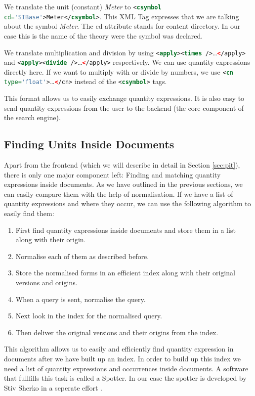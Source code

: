 We translate the unit (constant) \textit{Meter} to \lstinline[language=XML]{<csymbol cd='SIBase'>Meter</csymbol>}. This XML Tag expresses that we are talking about the symbol \textit{Meter}. The cd attribute stands for content directory. In our case this is the name of the theory were the symbol was declared.

We translate multiplication and division by using \lstinline[language=XML]{<apply><times />}\dots\lstinline[language=XML]{</apply>} and \lstinline[language=XML]{<apply><divide />}\dots\lstinline[language=XML]{</apply>} respectively. We can use quantity expressions directly here. If we want to multiply with or divide by numbers, we use \lstinline[language=XML]{<cn type='float'>}\dots\lstinline[language=XML]{</cn>} instead of the \lstinline[language=XML]{<csymbol>} tags.

This format allows us to easily exchange quantity expressions. It is also easy to send quantity expressions from the user to the backend (the core component of the search engine).

\subsection{Finding Units Inside Documents}
Apart from the frontend (which we will describe in detail in Section \ref{sec:pit}), there is only one major component left: Finding and matching quantity expressions inside documents. As we have outlined in the previous sections, we can easily compare them with the help of normalisation. If we have a list of quantity expressions and where they occur, we can use the following algorithm to easily find them:
\begin{enumerate}
  \item First find quantity expressions inside documents and store them in a list along with their origin.
  \item Normalise each of them as described before.
  \item Store the normalised forms in an efficient index along with their original versions and origins.
  \item When a query is sent, normalise the query.
  \item Next look in the index for the normalised query.
  \item Then deliver the original versions and their origins from the index.
\end{enumerate}
This algorithm allows us to easily and efficiently find quantity expression in documents after we have built up an index. In order to build up this index we need a list of quantity expressions and occurrences inside documents. A software that fullfills this task is called a Spotter. In our case the spotter is developed by Stiv Sherko in a seperate effort \cite{thesis:sharko}.
